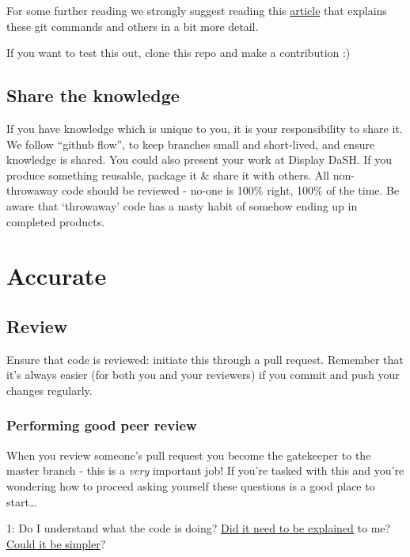 \documentclass[]{book}
\begin{document}
For some further reading we strongly suggest reading this \href{https://gist.github.com/blackfalcon/8428401}{article} that explains these git commands and others in a bit more detail.

If you want to test this out, clone this repo and make a contribution :)

\hypertarget{knowledge}{%
\subsection{Share the knowledge}\label{knowledge}}

If you have knowledge which is unique to you, it is your responsibility to share it.
We follow ``github flow'', to keep branches small and short-lived, and ensure knowledge is shared.
You could also present your work at Display DaSH.
If you produce something reusable, package it \& share it with others.
All non-throwaway code should be reviewed - no-one is 100\% right, 100\% of the time.
Be aware that `throwaway' code has a nasty habit of somehow ending up in completed products.

\hypertarget{accurate}{%
\section{Accurate}\label{accurate}}

\hypertarget{review}{%
\subsection{Review}\label{review}}

Ensure that code is reviewed: initiate this through a pull request. Remember that it's always easier (for both you and your reviewers) if you commit and push your changes regularly.

\hypertarget{performing-good-peer-review}{%
\subsubsection*{Performing good peer review}\label{performing-good-peer-review}}

When you review someone's pull request you become the gatekeeper to the master branch - this is a \emph{very} important job! If you're tasked with this and you're wondering how to proceed asking yourself these questions is a good place to start\ldots{}

1: Do I understand what the code is doing? \protect\hyperlink{users}{Did it need to be explained} to me? \protect\hyperlink{ccc}{Could it be simpler}?
\end{document}
